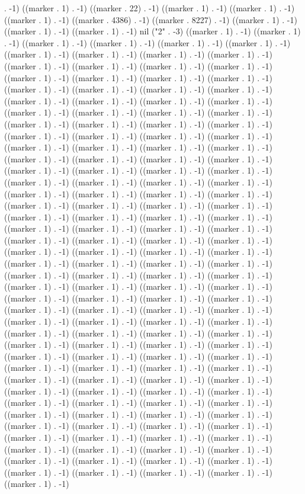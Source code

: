 . -1) ((marker . 1) . -1) ((marker . 22) . -1) ((marker . 1) . -1) ((marker . 1) . -1) ((marker . 1) . -1) ((marker . 4386) . -1) ((marker . 8227) . -1) ((marker . 1) . -1) ((marker . 1) . -1) ((marker . 1) . -1) nil ("2" . -3) ((marker . 1) . -1) ((marker . 1) . -1) ((marker . 1) . -1) ((marker . 1) . -1) ((marker . 1) . -1) ((marker . 1) . -1) ((marker . 1) . -1) ((marker . 1) . -1) ((marker . 1) . -1) ((marker . 1) . -1) ((marker . 1) . -1) ((marker . 1) . -1) ((marker . 1) . -1) ((marker . 1) . -1) ((marker . 1) . -1) ((marker . 1) . -1) ((marker . 1) . -1) ((marker . 1) . -1) ((marker . 1) . -1) ((marker . 1) . -1) ((marker . 1) . -1) ((marker . 1) . -1) ((marker . 1) . -1) ((marker . 1) . -1) ((marker . 1) . -1) ((marker . 1) . -1) ((marker . 1) . -1) ((marker . 1) . -1) ((marker . 1) . -1) ((marker . 1) . -1) ((marker . 1) . -1) ((marker . 1) . -1) ((marker . 1) . -1) ((marker . 1) . -1) ((marker . 1) . -1) ((marker . 1) . -1) ((marker . 1) . -1) ((marker . 1) . -1) ((marker . 1) . -1) ((marker . 1) . -1) ((marker . 1) . -1) ((marker . 1) . -1) ((marker . 1) . -1) ((marker . 1) . -1) ((marker . 1) . -1) ((marker . 1) . -1) ((marker . 1) . -1) ((marker . 1) . -1) ((marker . 1) . -1) ((marker . 1) . -1) ((marker . 1) . -1) ((marker . 1) . -1) ((marker . 1) . -1) ((marker . 1) . -1) ((marker . 1) . -1) ((marker . 1) . -1) ((marker . 1) . -1) ((marker . 1) . -1) ((marker . 1) . -1) ((marker . 1) . -1) ((marker . 1) . -1) ((marker . 1) . -1) ((marker . 1) . -1) ((marker . 1) . -1) ((marker . 1) . -1) ((marker . 1) . -1) ((marker . 1) . -1) ((marker . 1) . -1) ((marker . 1) . -1) ((marker . 1) . -1) ((marker . 1) . -1) ((marker . 1) . -1) ((marker . 1) . -1) ((marker . 1) . -1) ((marker . 1) . -1) ((marker . 1) . -1) ((marker . 1) . -1) ((marker . 1) . -1) ((marker . 1) . -1) ((marker . 1) . -1) ((marker . 1) . -1) ((marker . 1) . -1) ((marker . 1) . -1) ((marker . 1) . -1) ((marker . 1) . -1) ((marker . 1) . -1) ((marker . 1) . -1) ((marker . 1) . -1) ((marker . 1) . -1) ((marker . 1) . -1) ((marker . 1) . -1) ((marker . 1) . -1) ((marker . 1) . -1) ((marker . 1) . -1) ((marker . 1) . -1) ((marker . 1) . -1) ((marker . 1) . -1) ((marker . 1) . -1) ((marker . 1) . -1) ((marker . 1) . -1) ((marker . 1) . -1) ((marker . 1) . -1) ((marker . 1) . -1) ((marker . 1) . -1) ((marker . 1) . -1) ((marker . 1) . -1) ((marker . 1) . -1) ((marker . 1) . -1) ((marker . 1) . -1) ((marker . 1) . -1) ((marker . 1) . -1) ((marker . 1) . -1) ((marker . 1) . -1) ((marker . 1) . -1) ((marker . 1) . -1) ((marker . 1) . -1) ((marker . 1) . -1) ((marker . 1) . -1) ((marker . 1) . -1) ((marker . 1) . -1) ((marker . 1) . -1) ((marker . 1) . -1) ((marker . 1) . -1) ((marker . 1) . -1) ((marker . 1) . -1) ((marker . 1) . -1) ((marker . 1) . -1) ((marker . 1) . -1) ((marker . 1) . -1) ((marker . 1) . -1) ((marker . 1) . -1) ((marker . 1) . -1) ((marker . 1) . -1) ((marker . 1) . -1) ((marker . 1) . -1) ((marker . 1) . -1) ((marker . 1) . -1) ((marker . 1) . -1) ((marker . 1) . -1) ((marker . 1) . -1) ((marker . 1) . -1) ((marker . 1) . -1) ((marker . 1) . -1) ((marker . 1) . -1) ((marker . 1) . -1) ((marker . 1) . -1) ((marker . 1) . -1) ((marker . 1) . -1) ((marker . 1) . -1) ((marker . 1) . -1) ((marker . 1) . -1) ((marker . 1) . -1) ((marker . 1) . -1) ((marker . 1) . -1) ((marker . 1) . -1) 